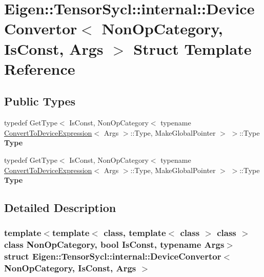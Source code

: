 \hypertarget{struct_eigen_1_1_tensor_sycl_1_1internal_1_1_device_convertor}{}\section{Eigen\+:\+:Tensor\+Sycl\+:\+:internal\+:\+:Device\+Convertor$<$ Non\+Op\+Category, Is\+Const, Args $>$ Struct Template Reference}
\label{struct_eigen_1_1_tensor_sycl_1_1internal_1_1_device_convertor}
\subsection*{Public Types}
\begin{DoxyCompactItemize}
\item 
\mbox{\label{struct_eigen_1_1_tensor_sycl_1_1internal_1_1_device_convertor_a071e296e8c40a15dad41cd5815723921}} 
typedef Get\+Type$<$ Is\+Const, Non\+Op\+Category$<$ typename \hyperlink{struct_eigen_1_1_tensor_sycl_1_1internal_1_1_convert_to_device_expression}{Convert\+To\+Device\+Expression}$<$ Args $>$\+::Type, Make\+Global\+Pointer $>$ $>$\+::Type {\bfseries Type}
\item 
\mbox{\label{struct_eigen_1_1_tensor_sycl_1_1internal_1_1_device_convertor_a071e296e8c40a15dad41cd5815723921}} 
typedef Get\+Type$<$ Is\+Const, Non\+Op\+Category$<$ typename \hyperlink{struct_eigen_1_1_tensor_sycl_1_1internal_1_1_convert_to_device_expression}{Convert\+To\+Device\+Expression}$<$ Args $>$\+::Type, Make\+Global\+Pointer $>$ $>$\+::Type {\bfseries Type}
\end{DoxyCompactItemize}


\subsection{Detailed Description}
\subsubsection*{template$<$template$<$ class, template$<$ class $>$ class $>$ class Non\+Op\+Category, bool Is\+Const, typename Args$>$\newline
struct Eigen\+::\+Tensor\+Sycl\+::internal\+::\+Device\+Convertor$<$ Non\+Op\+Category, Is\+Const, Args $>$}



